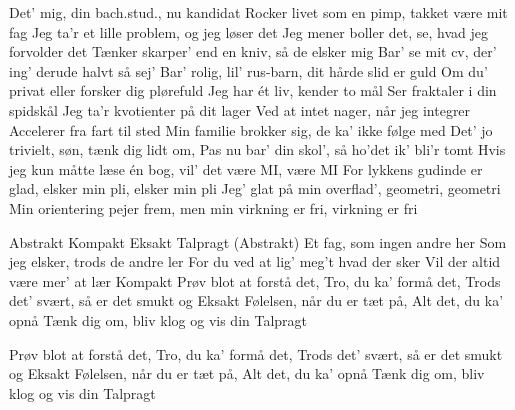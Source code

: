 \documentclass[a4paper,11pt]{article}
\begin{document}
\begin{song}
 Det' mig, din bach.stud., nu kandidat
Rocker livet som en pimp, takket være mit fag
Jeg ta'r et lille problem, og jeg løser det
Jeg mener boller det, se, hvad jeg forvolder det
Tænker skarper' end en kniv, så de elsker mig
Bar' se mit cv, der' ing' derude halvt så sej'
Bar' rolig, lil' rus-barn, dit hårde slid er guld
Om du' privat eller forsker dig plørefuld
Jeg har ét liv, kender to mål
Ser fraktaler i din spidskål
Jeg ta'r kvotienter på dit lager 
Ved at intet nager, når jeg integrer
Accelerer fra fart til sted
Min familie brokker sig, de ka' ikke følge med
Det' jo trivielt, søn, tænk dig lidt om,
Pas nu bar' din skol', så ho'det ik' bli'r tomt
Hvis jeg kun måtte læse én bog, vil' det være MI, være MI
For lykkens gudinde er glad, elsker min pli, elsker min pli
Jeg' glat på min overflad', geometri, geometri
Min orientering pejer frem, men min virkning er fri, virkning er fri

 Abstrakt
Kompakt
Eksakt
Talpragt (Abstrakt)
Et fag, som ingen andre her
Som jeg elsker, trods de andre ler
For du ved at lig’ meg’t hvad der sker
Vil der altid være mer’ at lær
Kompakt
Prøv blot at forstå det,
Tro, du ka' formå det,
Trods det’ svært, så er det smukt og
Eksakt
Følelsen, når du er tæt på,
Alt det, du ka’ opnå
Tænk dig om, bliv klog og vis din
Talpragt

 Prøv blot at forstå det,
Tro, du ka' formå det,
Trods det’ svært, så er det smukt og
Eksakt
Følelsen, når du er tæt på,
Alt det, du ka’ opnå
Tænk dig om, bliv klog og vis din
Talpragt




\end{song}
\end{document}
